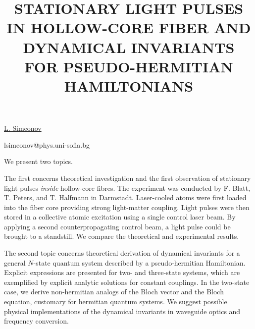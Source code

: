 \title{STATIONARY LIGHT PULSES IN HOLLOW-CORE FIBER AND DYNAMICAL INVARIANTS FOR PSEUDO-HERMITIAN HAMILTONIANS}

\underline{L. Simeonov} 

{\normalsize{\vspace{-4mm}
\unisofia

\email lsimeonov@phys.uni-sofia.bg}}

We present two topics.

The first concerns theoretical investigation and the first observation of stationary light pulses \textit{inside} hollow-core fibres. The experiment was conducted by F. Blatt, T. Peters, and T. Halfmann in Darmstadt. Laser-cooled atoms were first loaded into the fiber core providing strong light-matter coupling. Light pulses were then stored in a collective atomic excitation using a single control laser beam. By applying a second counterpropagating control beam, a light pulse could be brought to a standstill. We compare the theoretical and experimental results.

The second topic concerns theoretical derivation of dynamical invariants for a general $N$-state quantum system described by a pseudo-hermitian Hamiltonian. Explicit expressions are presented for two- and three-state systems, which are exemplified by explicit analytic solutions for constant couplings. In the two-state case, we derive
non-hermitian analogs of the Bloch vector and the Bloch equation, customary for hermitian quantum
systems. We suggest possible physical implementations of the dynamical invariants in waveguide
optics and frequency conversion.


\vspace{\baselineskip} 